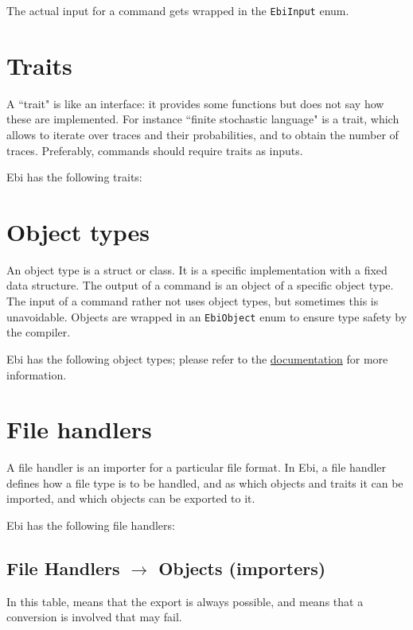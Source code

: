 \documentclass{book}
\begin{document}
        The actual input for a command gets wrapped in the \texttt{EbiInput} enum.
    
    \section{Traits}
    \label{sec:traits}
        A ``trait" is like an interface: it provides some functions but does not say how these are implemented.
        For instance ``finite stochastic language" is a trait, which allows to iterate over traces and their probabilities, and to obtain the number of traces.
        Preferably, commands should require traits as inputs.

        Ebi has the following traits:
        \ebitraitlist
    
    \section{Object types}
    \label{sec:objecttypes}
        An object type is a struct or class.
        It is a specific implementation with a fixed data structure.
        The output of a command is an object of a specific object type.
        The input of a command rather not uses object types, but sometimes this is unavoidable.
        Objects are wrapped in an \texttt{EbiObject} enum to ensure type safety by the compiler.

        Ebi has the following object types; please refer to the \href{https://docs.rs/ebi_objects/latest/ebi_objects/}{documentation} for more information.
        \ebiobjecttypelist
    
    \section{File handlers}
        A file handler is an importer for a particular file format.
        In Ebi, a file handler defines how a file type is to be handled, and as which objects and traits it can be imported, and which objects can be exported to it.

        Ebi has the following file handlers:
        \ebifilehandlerlist

        \subsection{File Handlers $\rightarrow$ Objects (importers)}
            \begin{center}
                \filehandlersobjecttypes
            \end{center}
            In this table, \CIRCLE{} means that the export is always possible, and \LEFTcircle{} means that a conversion is involved that may fail.
\end{document}
